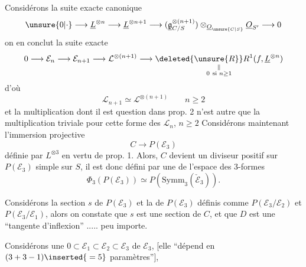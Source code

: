  Considérons la suite exacte canonique
\[
\unsure{0|\cdot}\longrightarrow\underline L^{\otimes n}\longrightarrow\underline L^{\otimes n+1}\longrightarrow
(\underline{\mathfrak g}_{C/S}^{\otimes(n+1)})\otimes_{\underline O_{\unsure{C|S}}}\underline O_{S'}\longrightarrow0
\]
on en conclut la suite exacte
\[
0\longrightarrow\mathcal E_n\longrightarrow\mathcal E_{n+1}\longrightarrow\mathcal L^{\otimes(n+1)}\longrightarrow
\underset{\substack{\Vert\\0\ \text{si }n\geq1}}{\deleted{\unsure{R}}R^{1}(f,\underline L^{\otimes n})}
\]
d'où
\[
\boxed{\mathcal L_{n+1}\simeq\mathcal L^{\otimes(n+1)}\qquad n\geq2}
\]
et la multiplication dont il est question dans prop. 2 n'est autre que la multiplication triviale pour cette forme des $\mathcal L_n$, $n\geq2$
Considérons maintenant l'immersion projective
\[
C\longrightarrow P(\mathcal E_3)
\]
définie par $L^{\otimes3}$ en vertu de prop. 1. Alors, $C$ devient un diviseur positif sur $P(\mathcal E_3)$ simple sur $S$,  il est donc défini par une   de l'espace des 3-formes
\[
\Phi_3(P(\mathcal E_3))\simeq P(\mathrm{Symm}_3(\check{\mathcal E}_3)).
\]


Considérons la section $s$ de $P(\mathcal E_3)$ et la   de $P(\mathcal E_3)$ définis comme $P(\mathcal E_3/\mathcal E_2)$ et $P(\mathcal E_3/\mathcal E_1)$, alors on constate que $s$ est une section de $C$, et que $D$ est une ``tangente d'inflexion'' ..... peu importe.


Considérons une    $0\subset\mathcal E_1\subset\mathcal E_2\subset\mathcal E_3$ de $\mathcal E_3$,  [elle ``dépend en $(3+3-1)\inserted{{}=5}$ paramètres''],  


